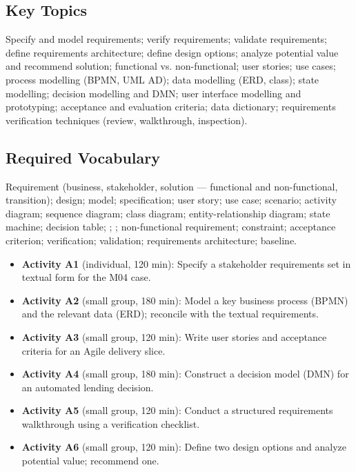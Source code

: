 \documentclass[11pt,letterpaper,oneside]{report}
\begin{document}
\subsection*{Key Topics}
Specify and model requirements; verify requirements; validate requirements; define requirements architecture; define design options; analyze potential value and recommend solution; functional vs. non-functional; user stories; use cases; process modelling (BPMN, UML AD); data modelling (ERD, class); state modelling; decision modelling and DMN; user interface modelling and prototyping; acceptance and evaluation criteria; data dictionary; requirements verification techniques (review, walkthrough, inspection).

\subsection*{Required Vocabulary}
Requirement (business, stakeholder, solution --- functional and non-functional, transition); design; model; specification; user story; use case; scenario; activity diagram; sequence diagram; class diagram; entity-relationship diagram; state machine; decision table; ; ; non-functional requirement; constraint; acceptance criterion; verification; validation; requirements architecture; baseline.

\begin{labbox}
\begin{itemize}
  \item \textbf{Activity A1} (individual, 120 min): Specify a stakeholder requirements set in textual form for the M04 case.
  \item \textbf{Activity A2} (small group, 180 min): Model a key business process (BPMN) and the relevant data (ERD); reconcile with the textual requirements.
  \item \textbf{Activity A3} (small group, 120 min): Write user stories and acceptance criteria for an Agile delivery slice.
  \item \textbf{Activity A4} (small group, 180 min): Construct a decision model (DMN) for an automated lending decision.
  \item \textbf{Activity A5} (small group, 120 min): Conduct a structured requirements walkthrough using a verification checklist.
  \item \textbf{Activity A6} (small group, 120 min): Define two design options and analyze potential value; recommend one.
\end{itemize}
\end{labbox}
\end{document}
